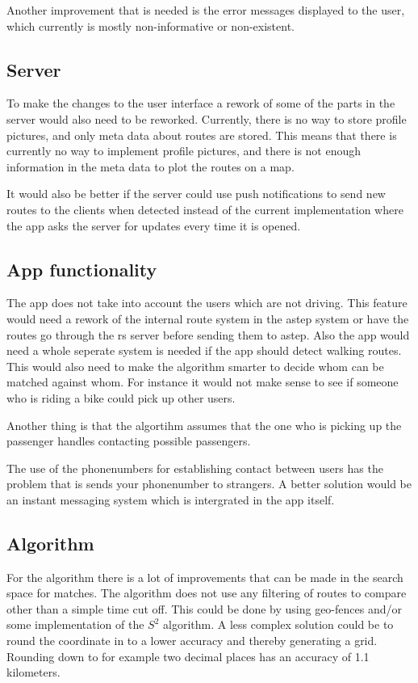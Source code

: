 Another improvement that is needed is the error messages displayed to the user, which currently is mostly non-informative or non-existent.

\subsection{Server}
To make the changes to the user interface a rework of some of the parts in the server would also need to be reworked.
Currently, there is no way to store profile pictures, and only meta data about routes are stored.
This means that there is currently no way to implement profile pictures, and there is not enough information in the meta data to plot the routes on a map.

It would also be better if the server could use push notifications to send new routes to the clients when detected instead of the current implementation where the app asks the server for updates every time it is opened.

\subsection{App functionality}

The app does not take into account the users which are not driving.
This feature would need a rework of the internal route system in the \gls{astep} system or have the routes go through the \gls{rs} server before sending them to \gls{astep}.
Also the app would need a whole seperate system is needed if the app should detect walking routes.
This would also need to make the algorithm smarter to decide whom can be matched against whom.
For instance it would not make sense to see if someone who is riding a bike could pick up other users.

Another thing is that the algortihm assumes that the one who is picking up the passenger handles contacting possible passengers.


The use of the phonenumbers for establishing contact between users has the problem that is sends your phonenumber to strangers.
A better solution would be an instant messaging system which is intergrated in the app itself.

\subsection{Algorithm}
For the algorithm there is a lot of improvements that can be made in the search space for matches.
The algorithm does not use any filtering of routes to compare other than a simple time cut off.
This could be done by using geo-fences and/or some implementation of the $S^2$ algorithm.
A less complex solution could be to round the coordinate in to a lower accuracy and thereby generating a grid.
Rounding down to for example two decimal places has an accuracy of 1.1 kilometers.

